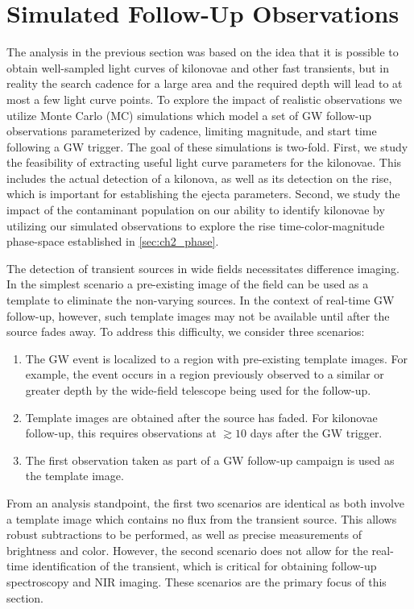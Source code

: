 \section{Simulated Follow-Up Observations}
\label{sec:ch2_MCsims}
The analysis in the previous section was based on the idea that it is possible to obtain well-sampled light curves of kilonovae and other fast transients, but in reality the search cadence for a large area and the required depth will lead to at most a few light curve points. To explore the impact of realistic observations we utilize Monte Carlo (MC) simulations which model a set of GW follow-up observations parameterized by cadence, limiting magnitude, and start time following a GW trigger.  The goal of these simulations is two-fold. First, we study the feasibility of extracting useful light curve parameters for the kilonovae. This includes the actual detection of a kilonova, as well as its detection on the rise, which is important for establishing the ejecta parameters. Second, we study the impact of the contaminant population on our ability to identify kilonovae by utilizing our simulated observations to explore the rise time-color-magnitude phase-space established in \cref{sec:ch2_phase}.

The detection of transient sources in wide fields necessitates difference imaging. In the simplest scenario a pre-existing image of the field can be used as a template to eliminate the non-varying sources. In the context of real-time GW follow-up, however, such template images may not be available until after the source fades away. To address this difficulty, we consider three scenarios:
\begin{enumerate}
\item The GW event is localized to a region with pre-existing template images. For example, the event occurs in a region previously observed to a similar or greater depth by the wide-field telescope being used for the follow-up.
\item Template images are obtained after the source has faded. For kilonovae follow-up, this requires observations at $\gtrsim10$ days after the GW trigger.
\item The first observation taken as part of a GW follow-up campaign is used as the template image.
\end{enumerate}

From an analysis standpoint, the first two scenarios are identical as both involve a template image which contains no flux from the transient source. This allows robust subtractions to be performed, as well as precise measurements of brightness and color. However, the second scenario does not allow for the real-time identification of the transient, which is critical for obtaining follow-up spectroscopy and NIR imaging. These scenarios are the primary focus of this section. 

